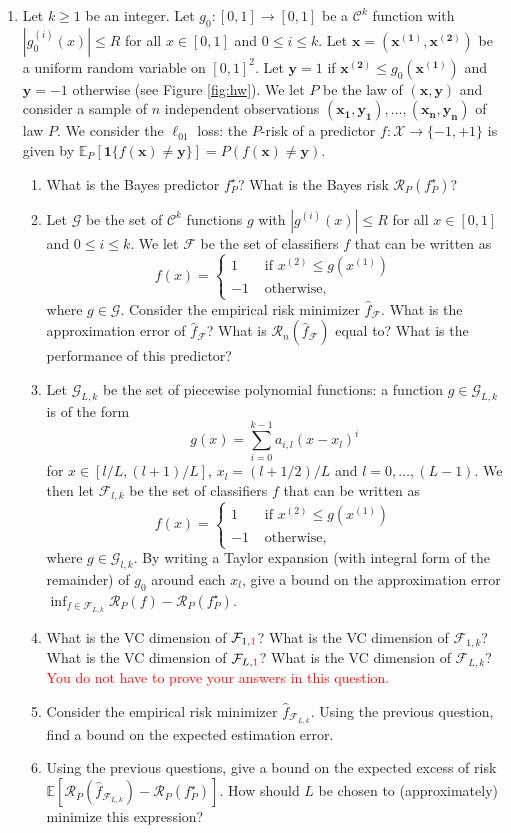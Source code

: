 \documentclass[12pt]{article}
\renewcommand{\b}[1]{\mathbf{#1 }}
\newcommand{\ones}{\mathbf{1}}
\newcommand{\E}{\mathbb{E}}
\newcommand{\CC}{\mathcal{C}}
\newcommand{\FF}{\mathcal{F}}
\newcommand{\GG}{\mathcal{G}}
\newcommand{\RR}{\mathcal{R}}
\newcommand{\XX}{\mathcal{X}}
\begin{document}
\begin{enumerate}
\item Let $k\geq 1$ be an integer. Let $g_0:[0,1] \to [0,1]$ be a $\CC^k$ function with $|g_0^{(i)}(x)|\leq R$ for all $x\in[0,1]$ and $0\leq i \leq k$. Let $\b{x}=(\b{x^{(1)}},\b{x^{(2)}})$ be a uniform random variable on $[0,1]^2$. Let $\b{y} = 1$ if $\b{x^{(2)}}\leq g_0(\b{x^{(1)}})$ and $\b{y}=-1$ otherwise (see Figure \ref{fig:hw}). We let $P$ be the law of $(\b{x},\b{y})$ and consider a sample of $n$ independent observations $(\b{x_1},\b{y_1}),\dots,(\b{x_n},\b{y_n})$ of law $P$. We consider the $\ell_{01}$ loss: the $P$-risk of a predictor $f:\XX\to\{-1,+1\}$ is given by $\E_P[\ones\{f(\b{x})\neq \b{y}\}] = P(f(\b{x})\neq\b{y})$.
\begin{enumerate}
\item What is the Bayes predictor $f^\star_P$? What is the Bayes risk $\RR_P(f^\star_P)$?
\item Let $\GG$ be the set of $\CC^k$ functions $g$ with $|g^{(i)}(x)|\leq R$ for all $x\in[0,1]$ and $0\leq i \leq k$. We let $\FF$ be the set of classifiers $f$ that can be written as 
\[
f(x) = \begin{cases}
1 &\text{ if } x^{(2)}\leq g(x^{(1)})\\
-1 & \text{ otherwise,}
\end{cases}
\]
where $g\in \GG$.  Consider the empirical risk minimizer $\hat f_{\FF}$. What is the approximation error of $\hat f_\FF$? What is $\RR_n(\hat f_{\FF})$ equal to? What is the performance of this predictor? 
\item Let $\GG_{L,k}$ be the set of piecewise polynomial functions: a function $g\in \GG_{L,k}$ is of the form
\begin{equation}
g(x) = \sum_{i=0}^{k-1} a_{i,l} (x-x_l)^i
\end{equation}
for $x \in [l/L, (l+1)/L]$, $x_l = (l+1/2)/L$ and $l=0,\dots,(L-1)$. We then let $\FF_{l,k}$ be the set of classifiers $f$ that can be written as 
\[
f(x) = \begin{cases}
1 &\text{ if } x^{(2)}\leq g(x^{(1)})\\
-1 & \text{ otherwise,}
\end{cases}
\]
where $g\in \GG_{l,k}$.  By writing a Taylor expansion (with integral form of the remainder) of $g_0$ around each $x_l$, give a bound on the approximation error $\inf_{f\in \FF_{L,k}} \RR_P(f) - \RR_P(f^\star_P)$.
\item What is the VC dimension of $\FF_{1,\textcolor{red}{1}}$? What is the VC dimension of $\FF_{1,k}$? What is the VC dimension of $\FF_{L,\textcolor{red}{1}}$? What is the VC dimension of $\FF_{L,k}$? \textcolor{red}{You do not have to prove your answers in this question.}
\item Consider the empirical risk minimizer $\hat f_{\FF_{L,k}}$. Using the previous question, find a bound on the expected estimation error. 
\item Using the previous questions, give a bound on the expected excess of risk $\E[\RR_P(\hat f_{\FF_{L,k}})-\RR_P(f^\star_P)]$. How should $L$ be chosen to (approximately) minimize this expression?
\end{enumerate}
\end{enumerate}
\end{document}
